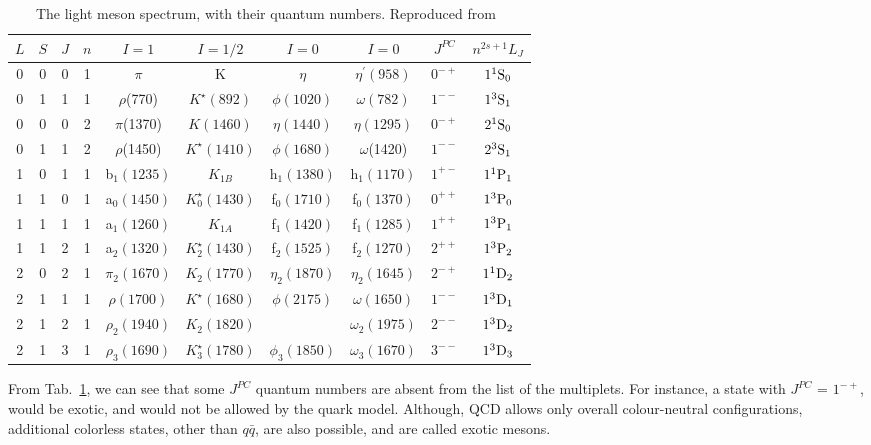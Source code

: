 \begin{table}[H]
    \centering
    \caption{The light meson spectrum, with their quantum numbers. Reproduced from~\cite{8}}
    \label{tab.1.1}
    \begin{tabular}{cccccccccc}
        \hline
        $L$\qquad & $S$\qquad & $J$\qquad & $n$\qquad & $I=1$\qquad & $I=1/2$ \qquad & $I=0$\qquad & $I=0$\qquad & $J^{PC}$\qquad & $n^{2s+1}L_J$\qquad \\
        \hline
        0 & 0 & 0 & 1 & $\pi$ & K & $\eta$ & $\eta^{\prime}(958)$ & $0^{-+}$ & $\rm 1^1S_0$ \\
        0 & 1 & 1 & 1 & $\rho$(770) & $K^{\star}(892)$ & $\phi(1020)$ & $\omega(782)$ & $1^{--}$ & $\rm 1^3S_1$ \\
        \hline
        0 & 0 & 0 & 2 & $\pi$(1370) &  $K(1460)$  & $\eta (1440)$  & $\eta (1295)$ & $0^{-+}$ & $\rm 2^1S_0$\\
        0 & 1 & 1 & 2 & $\rho$(1450) & $K^{\star}(1410)$ & $\phi (1680)$ & $\omega$(1420) & $1^{--}$ & $\rm 2^3S_1$\\
        \hline        
        1 & 0 & 1 & 1 & b$_1(1235)$ & $K_{1B}$ & h$_1(1380)$ & h$_1(1170)$ \quad & $1^{+-}$ & $\rm 1^1P_1$\\
        1 & 1 & 0 & 1 & a$_0(1450)$ & $K_{0}^{\star}(1430)$ & f$_0(1710)$ & f$_0(1370)$ & $0^{++}$ & $\rm 1^3P_0$\\
        1 & 1 & 1 & 1 & a$_1(1260)$ & $K_{1A}$ & f$_1(1420)$ & f$_1(1285)$ & $1^{++}$ & $\rm 1^3P_1$\\
        1 & 1 & 2 & 1 & a$_2(1320)$ & $K_{2}^{\star}(1430)$ & f$_2(1525)$ & f$_2(1270)$ & $2^{++}$ & $\rm 1^3P_2$\\
        \hline
        2 & 0 & 2 & 1 & $\pi_2(1670)$ & $K_{2}(1770)$ & $\eta_2(1870)$ & $\eta_2(1645)$ & $2^{-+}$ & $\rm 1^1D_2$\\
        2 & 1 & 1 & 1 & $\rho(1700)$ & $K^{\star}(1680)$ & $\phi(2175)$ & $\omega(1650)$ & $1^{--}$ & $\rm 1^3D_1$\\
        2 & 1 & 2 & 1 & $\rho_2(1940)$ & $K_2(1820)$ &  & $\omega_2(1975)$ & $2^{--}$ & $\rm 1^3D_2$\\
        2 & 1 & 3 & 1 & $\rho_3(1690)$ & $K^{\star}_3(1780)$ & $\phi_3(1850)$ & $\omega_3(1670)$ & $3^{--}$ & $\rm 1^3D_3$\\
        \hline
    \end{tabular}
\end{table}

From Tab.~\ref{tab.1.1}, we can see that some $J^{PC}$ quantum numbers are absent from the list of the multiplets. For instance, a state with $J^{PC}$ = $1^{-+}$, would be exotic, and would not be allowed by the quark model. Although, QCD allows only overall colour-neutral configurations, additional colorless states, other than $q\bar{q}$, are also possible, and are called exotic mesons.

